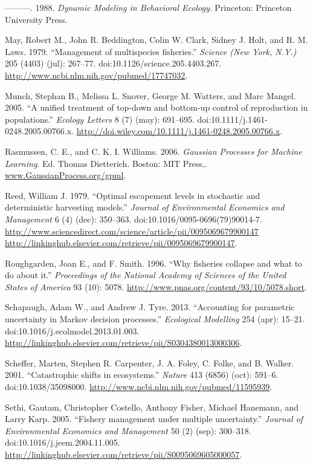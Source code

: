 \documentclass[author-year, review]{elsarticle} %
\begin{document}
---------. 1988. \emph{Dynamic Modeling in Behavioral Ecology}.
Princeton: Princeton University Press.

May, Robert M., John R. Beddington, Colin W. Clark, Sidney J. Holt, and
R. M. Laws. 1979. ``Management of multispecies fisheries.''
\emph{Science (New York, N.Y.)} 205 (4403) (jul): 267--77.
doi:10.1126/science.205.4403.267.
\url{http://www.ncbi.nlm.nih.gov/pubmed/17747032}.

Munch, Stephan B., Melissa L. Snover, George M. Watters, and Marc
Mangel. 2005. ``A unified treatment of top-down and bottom-up control of
reproduction in populations.'' \emph{Ecology Letters} 8 (7) (may):
691--695. doi:10.1111/j.1461-0248.2005.00766.x.
\url{http://doi.wiley.com/10.1111/j.1461-0248.2005.00766.x}.

Rasmussen, C. E., and C. K. I. Williams. 2006. \emph{Gaussian Processes
for Machine Learning}. Ed. Thomas Dietterich. Boston: MIT Press,.
\url{www.GaussianProcess.org/gpml}.

Reed, William J. 1979. ``Optimal escapement levels in stochastic and
deterministic harvesting models.'' \emph{Journal of Environmental
Economics and Management} 6 (4) (dec): 350--363.
doi:10.1016/0095-0696(79)90014-7.
\href{http://www.sciencedirect.com/science/article/pii/0095069679900147 http://linkinghub.elsevier.com/retrieve/pii/0095069679900147}{http://www.sciencedirect.com/science/article/pii/0095069679900147
http://linkinghub.elsevier.com/retrieve/pii/0095069679900147}.

Roughgarden, Joan E., and F. Smith. 1996. ``Why fisheries collapse and
what to do about it.'' \emph{Proceedings of the National Academy of
Sciences of the United States of America} 93 (10): 5078.
\url{http://www.pnas.org/content/93/10/5078.short}.

Schapaugh, Adam W., and Andrew J. Tyre. 2013. ``Accounting for
parametric uncertainty in Markov decision processes.'' \emph{Ecological
Modelling} 254 (apr): 15--21. doi:10.1016/j.ecolmodel.2013.01.003.
\url{http://linkinghub.elsevier.com/retrieve/pii/S0304380013000306}.

Scheffer, Marten, Stephen R. Carpenter, J. A. Foley, C. Folke, and B.
Walker. 2001. ``Catastrophic shifts in ecosystems.'' \emph{Nature} 413
(6856) (oct): 591--6. doi:10.1038/35098000.
\url{http://www.ncbi.nlm.nih.gov/pubmed/11595939}.

Sethi, Gautam, Christopher Costello, Anthony Fisher, Michael Hanemann,
and Larry Karp. 2005. ``Fishery management under multiple uncertainty.''
\emph{Journal of Environmental Economics and Management} 50 (2) (sep):
300--318. doi:10.1016/j.jeem.2004.11.005.
\url{http://linkinghub.elsevier.com/retrieve/pii/S0095069605000057}.
\end{document}
